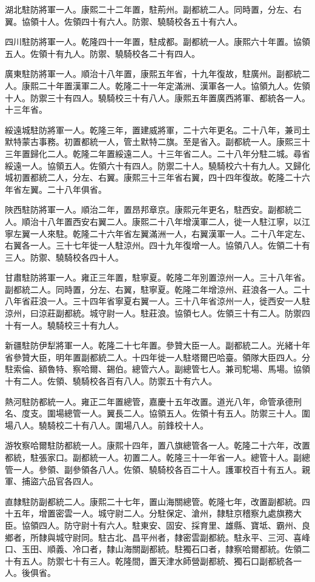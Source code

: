 \begin{pinyinscope}
湖北駐防將軍一人。康熙二十二年置，駐荊州。副都統二人。同時置，分左、右翼。協領十人。佐領四十有六人。防禦、驍騎校各五十有六人。

四川駐防將軍一人。乾隆四十一年置，駐成都。副都統一人。康熙六十年置。協領五人。佐領十有九人。防禦、驍騎校各二十有四人。

廣東駐防將軍一人。順治十八年置，康熙五年省，十九年復故，駐廣州。副都統二人。康熙二十年置漢軍二人。乾隆二十一年定滿洲、漢軍各一人。協領九人。佐領十人。防禦三十有四人。驍騎校三十有八人。康熙五年置廣西將軍、都統各一人。十三年省。

綏遠城駐防將軍一人。乾隆三年，置建威將軍，二十六年更名。二十八年，兼司土默特蒙古事務。初置都統一人，管土默特二旗。至是省入。副都統一人。康熙三十三年置歸化二人。乾隆二年置綏遠二人。十三年省二人。二十八年分駐二城。尋省綏遠一人。協領五人。佐領六十有四人。防禦二十人。驍騎校六十有九人。又歸化城初置都統二人，分左、右翼。康熙三十三年省右翼，四十四年復故。乾隆二十六年省左翼。二十八年俱省。

陜西駐防將軍一人。順治二年，置昂邦章京。康熙元年更名，駐西安。副都統二人。順治十八年置西安右翼二人。康熙二十八年增漢軍二人，徙一人駐江寧，以江寧左翼一人來駐。乾隆二十六年省左翼滿洲一人，右翼漢軍一人。二十八年定左、右翼各一人。三十七年徙一人駐涼州。四十九年復增一人。協領八人。佐領二十有三人。防禦、驍騎校各四十人。

甘肅駐防將軍一人。雍正三年置，駐寧夏。乾隆二年別置涼州一人。三十八年省。副都統二人。同時置，分左、右翼，駐寧夏。乾隆二年增涼州、莊浪各一人。二十八年省莊浪一人。三十四年省寧夏右翼一人。三十八年省涼州一人，徙西安一人駐涼州，曰涼莊副都統。城守尉一人。駐莊浪。協領七人。佐領三十有二人。防禦四十有一人。驍騎校三十有九人。

新疆駐防伊犁將軍一人。乾隆二十七年置。參贊大臣一人。副都統二人。光緒十年省參贊大臣，明年置副都統二人。十四年徙一人駐塔爾巴哈臺。領隊大臣四人。分駐索倫、額魯特、察哈爾、錫伯。總管六人。副總管七人。兼司駝場、馬場。協領十有二人。佐領、驍騎校各百有八人。防禦五十有六人。

熱河駐防都統一人。雍正二年置總管，嘉慶十五年改置。道光八年，命管承德刑名、度支。圍場總管一人。翼長二人。協領五人。佐領十有五人。防禦三十人。圍場八人。驍騎校二十有八人。圍場八人。前鋒校十人。

游牧察哈爾駐防都統一人。康熙十四年，置八旗總管各一人。乾隆二十六年，改置都統，駐張家口。副都統一人。初置二人。乾隆三十一年省一人。總管十人。副總管一人。參領、副參領各八人。佐領、驍騎校各百二十人。護軍校百十有五人。親軍、捕盜六品官各四人。

直隸駐防副都統二人。康熙二十七年，置山海關總管。乾隆七年，改置副都統。四十五年，增置密雲一人。城守尉二人。分駐保定、滄州，隸駐京稽察九處旗務大臣。協領四人。防守尉十有六人。駐東安、固安、採育里、雄縣、寶坻、霸州、良鄉者，所隸與城守尉同。駐古北、昌平州者，隸密雲副都統。駐永平、三河、喜峰口、玉田、順義、冷口者，隸山海關副都統。駐獨石口者，隸察哈爾都統。佐領二十有五人。防禦七十有三人。乾隆間，置天津水師營副都統、獨石口副都統各一人。後俱省。


\end{pinyinscope}
